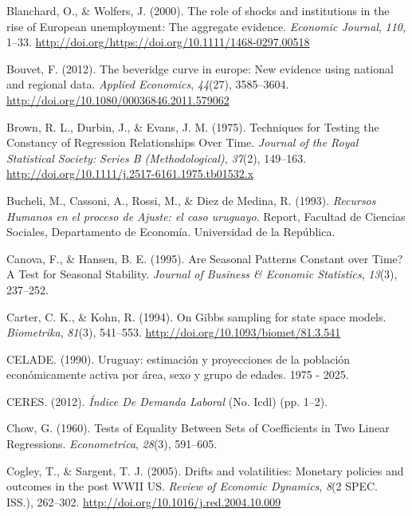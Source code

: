 \documentclass[12pt,oneside]{reedthesis}
\begin{document}
\leavevmode\hypertarget{ref-Blanchard2000}{}%
Blanchard, O., \& Wolfers, J. (2000). The role of shocks and institutions in the rise of European unemployment: The aggregate evidence. \emph{Economic Journal}, \emph{110}, 1--33. \url{http://doi.org/https://doi.org/10.1111/1468-0297.00518}

\leavevmode\hypertarget{ref-Bouvet2012}{}%
Bouvet, F. (2012). The beveridge curve in europe: New evidence using national and regional data. \emph{Applied Economics}, \emph{44}(27), 3585--3604. \url{http://doi.org/10.1080/00036846.2011.579062}

\leavevmode\hypertarget{ref-Brown1975}{}%
Brown, R. L., Durbin, J., \& Evans, J. M. (1975). Techniques for Testing the Constancy of Regression Relationships Over Time. \emph{Journal of the Royal Statistical Society: Series B (Methodological)}, \emph{37}(2), 149--163. \url{http://doi.org/10.1111/j.2517-6161.1975.tb01532.x}

\leavevmode\hypertarget{ref-DECON1993}{}%
Bucheli, M., Cassoni, A., Rossi, M., \& Diez de Medina, R. (1993). \emph{Recursos Humanos en el proceso de Ajuste: el caso uruguayo}. Report, Facultad de Ciencias Sociales, Departamento de Economía. Universidad de la República.

\leavevmode\hypertarget{ref-Canova1995}{}%
Canova, F., \& Hansen, B. E. (1995). Are Seasonal Patterns Constant over Time? A Test for Seasonal Stability. \emph{Journal of Business \& Economic Statistics}, \emph{13}(3), 237--252.

\leavevmode\hypertarget{ref-KarterKohn1994}{}%
Carter, C. K., \& Kohn, R. (1994). On Gibbs sampling for state space models. \emph{Biometrika}, \emph{81}(3), 541--553. \url{http://doi.org/10.1093/biomet/81.3.541}

\leavevmode\hypertarget{ref-Celade1990}{}%
CELADE. (1990). Uruguay: estimación y proyecciones de la población económicamente activa por área, sexo y grupo de edades. 1975 - 2025.

\leavevmode\hypertarget{ref-Ceres2012}{}%
CERES. (2012). \emph{Índice De Demanda Laboral} (No. Icdl) (pp. 1--2).

\leavevmode\hypertarget{ref-Chow1960}{}%
Chow, G. (1960). Tests of Equality Between Sets of Coefficients in Two Linear Regressions. \emph{Econometrica}, \emph{28}(3), 591--605.

\leavevmode\hypertarget{ref-Cogley2005}{}%
Cogley, T., \& Sargent, T. J. (2005). Drifts and volatilities: Monetary policies and outcomes in the post WWII US. \emph{Review of Economic Dynamics}, \emph{8}(2 SPEC. ISS.), 262--302. \url{http://doi.org/10.1016/j.red.2004.10.009}
\end{document}
